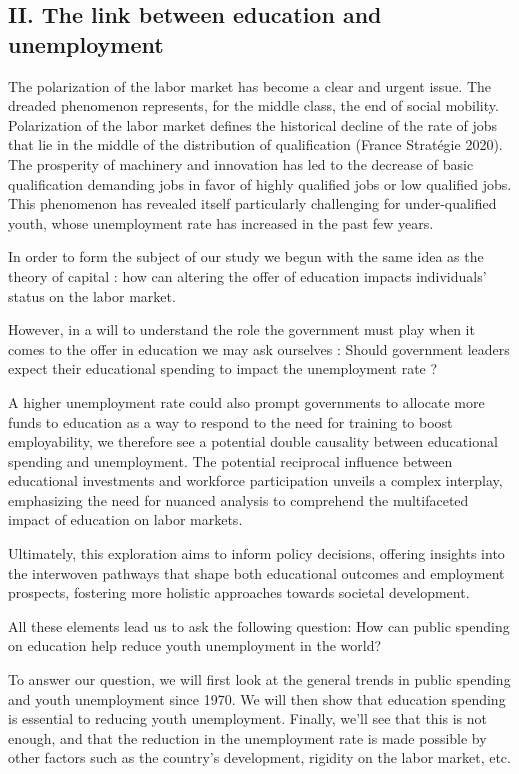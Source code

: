 \documentclass[
  letterpaper,
  DIV=11,
  numbers=noendperiod]{scrartcl}
\begin{document}
\hypertarget{ii.-the-link-between-education-and-unemployment}{%
\subsection{II. The link between education and
unemployment}\label{ii.-the-link-between-education-and-unemployment}}

The polarization of the labor market has become a clear and urgent
issue. The dreaded phenomenon represents, for the middle class, the end
of social mobility. Polarization of the labor market defines the
historical decline of the rate of jobs that lie in the middle of the
distribution of qualification (France Stratégie 2020). The prosperity of
machinery and innovation has led to the decrease of basic qualification
demanding jobs in favor of highly qualified jobs or low qualified jobs.
This phenomenon has revealed itself particularly challenging for
under-qualified youth, whose unemployment rate has increased in the past
few years.

In order to form the subject of our study we begun with the same idea as
the theory of capital : how can altering the offer of education impacts
individuals' status on the labor market.

However, in a will to understand the role the government must play when
it comes to the offer in education we may ask ourselves : Should
government leaders expect their educational spending to impact the
unemployment rate ?

A higher unemployment rate could also prompt governments to allocate
more funds to education as a way to respond to the need for training to
boost employability, we therefore see a potential double causality
between educational spending and unemployment. The potential reciprocal
influence between educational investments and workforce participation
unveils a complex interplay, emphasizing the need for nuanced analysis
to comprehend the multifaceted impact of education on labor markets.

Ultimately, this exploration aims to inform policy decisions, offering
insights into the interwoven pathways that shape both educational
outcomes and employment prospects, fostering more holistic approaches
towards societal development.

All these elements lead us to ask the following question: How can public
spending on education help reduce youth unemployment in the world?

To answer our question, we will first look at the general trends in
public spending and youth unemployment since 1970. We will then show
that education spending is essential to reducing youth unemployment.
Finally, we'll see that this is not enough, and that the reduction in
the unemployment rate is made possible by other factors such as the
country's development, rigidity on the labor market, etc.
\end{document}
